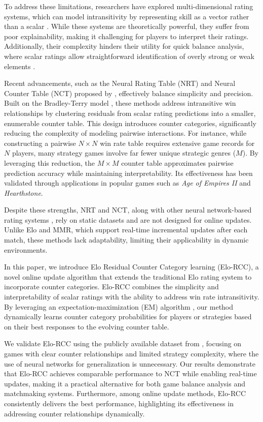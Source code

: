 To address these limitations, researchers have explored multi-dimensional rating systems, which can model intransitivity by representing skill as a vector rather than a scalar \citep{m_elo,nd_ability,hyperbolic_elo}. While these systems are theoretically powerful, they suffer from poor explainability, making it challenging for players to interpret their ratings. Additionally, their complexity hinders their utility for quick balance analysis, where scalar ratings allow straightforward identification of overly strong or weak elements \citep{game_balance_analysis}.

Recent advancements, such as the Neural Rating Table (NRT) and Neural Counter Table (NCT) proposed by \citet{game_balance_analysis}, effectively balance simplicity and precision. Built on the Bradley-Terry model \citep{bradley_terry}, these methods address intransitive win relationships by clustering residuals from scalar rating predictions into a smaller, enumerable counter table. This design introduces counter categories, significantly reducing the complexity of modeling pairwise interactions. For instance, while constructing a pairwise $N \times N$ win rate table requires extensive game records for $N$ players, many strategy games involve far fewer unique strategic genres ($M$). By leveraging this reduction, the $M \times M$ counter table approximates pairwise prediction accuracy while maintaining interpretability. Its effectiveness has been validated through applications in popular games such as \textit{Age of Empires II} and \textit{Hearthstone}.

Despite these strengths, NRT and NCT, along with other neural network-based rating systems \citep{neural_bt_model}, rely on static datasets and are not designed for online updates. Unlike Elo and MMR, which support real-time incremental updates after each match, these methods lack adaptability, limiting their applicability in dynamic environments.

In this paper, we introduce Elo Residual Counter Category learning (Elo-RCC), a novel online update algorithm that extends the traditional Elo rating system to incorporate counter categories. Elo-RCC combines the simplicity and interpretability of scalar ratings with the ability to address win rate intransitivity. By leveraging an expectation-maximization (EM) algorithm \citep{em_algorithm}, our method dynamically learns counter category probabilities for players or strategies based on their best responses to the evolving counter table.

We validate Elo-RCC using the publicly available dataset from \citet{game_balance_analysis}, focusing on games with clear counter relationships and limited strategy complexity, where the use of neural networks for generalization is unnecessary. Our results demonstrate that Elo-RCC achieves comparable performance to NCT while enabling real-time updates, making it a practical alternative for both game balance analysis and matchmaking systems. Furthermore, among online update methods, Elo-RCC consistently delivers the best performance, highlighting its effectiveness in addressing counter relationships dynamically.


